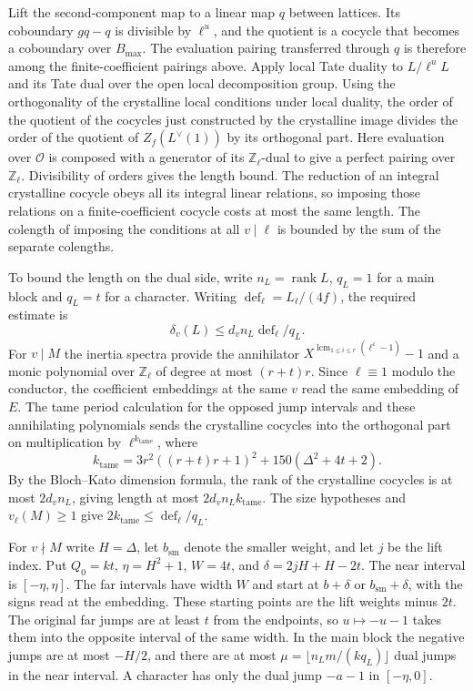 Lift the second-component map to a linear map \(q\) between lattices.
Its coboundary \(gq-q\) is divisible by \(\ell^u\), and the quotient
is a cocycle that becomes a coboundary over \(B_{\max}\).
The evaluation pairing transferred through \(q\) is therefore among
the finite-coefficient pairings above. Apply local Tate duality to
\(L/\ell^u L\) and its Tate dual over the open local decomposition
group. Using the orthogonality of the crystalline local conditions
under local duality, the order of the quotient of the cocycles just
constructed by the crystalline image divides the order of the
quotient of \(Z_f(L^\vee(1))\) by its orthogonal part.
Here evaluation over \(\mathcal O\) is composed with a generator
of its \(\mathbb Z_\ell\)-dual to give a perfect pairing over
\(\mathbb Z_\ell\). Divisibility of orders gives the length bound.
The reduction of an integral crystalline cocycle obeys all its
integral linear relations, so imposing those relations on a
finite-coefficient cocycle costs at most the same length.
The colength of imposing the conditions at all \(v\mid\ell\) is
bounded by the sum of the separate colengths.

To bound the length on the dual side, write \(n_L=\operatorname{rank}L\),
\(q_L=1\) for a main block and \(q_L=t\) for a character.
Writing \(\operatorname{def}_\ell=L_\ell/(4f)\), the required estimate is
\[
 \delta_v(L)\le d_v n_L\operatorname{def}_\ell/q_L .
\]
For \(v\mid M\) the inertia spectra provide the annihilator
\(X^{\operatorname{lcm}_{1\le i\le r}(\ell^i-1)}-1\) and a monic
polynomial over \(\mathbb Z_\ell\) of degree at most \((r+t)r\).
Since \(\ell\equiv1\) modulo the conductor, the coefficient
embeddings at the same \(v\) read the same embedding of \(E\).
The tame period calculation for the opposed jump intervals and
these annihilating polynomials sends the crystalline cocycles into
the orthogonal part on multiplication by \(\ell^{k_\mathrm{tame}}\),
where
\[
 k_\mathrm{tame}=3r^2((r+t)r+1)^2+150(\Delta^2+4t+2).
\]
By the Bloch--Kato dimension formula, the rank of the crystalline
cocycles is at most \(2d_v n_L\), giving length at most
\(2d_v n_L k_\mathrm{tame}\). The size hypotheses and \(v_\ell(M)\ge1\)
give \(2k_\mathrm{tame}\le\operatorname{def}_\ell/q_L\).

For \(v\nmid M\) write \(H=\Delta\), let \(b_{\mathrm{sm}}\) denote the smaller weight,
and let \(j\) be the lift index. Put \(Q_0=kt\), \(\eta=H^2+1\), \(W=4t\), and
\(\delta=2jH+H-2t\). The near interval is \([-\eta,\eta]\). The far intervals
have width \(W\) and start at \(b+\delta\) or \(b_{\mathrm{sm}}+\delta\),
with the signs read at the embedding. These starting points are the lift weights
minus \(2t\). The original far jumps are at least \(t\) from the endpoints, so
\(u\mapsto-u-1\) takes them into the opposite interval of the same width.
In the main block the negative jumps are at most \(-H/2\), and there are at most
\(\mu=\lfloor n_Lm/(kq_L)\rfloor\) dual jumps in the near interval.
A character has only the dual jump \(-a-1\) in \([-\eta,0]\).

